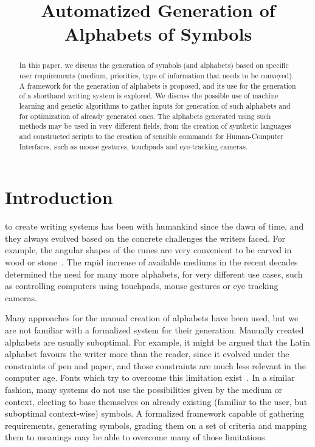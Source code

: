 \documentclass[conference]{IEEEtran}
\title{Automatized Generation of Alphabets of Symbols}
\author{
\IEEEauthorblockN{Serhii Hamotskyi}
\IEEEauthorblockA{
    Faculty of Informatics and Computer Technology \\
    Department of Computer Systems \\
    Igor Sykorsky Kyiv Polytechnic Institute \\
37, Prosp. Peremohy, Kyiv, Ukraine, 03056 \\
Email: shamotskyi@gmail.com}
}
\begin{document}
\maketitle              %

\begin{abstract}
In this paper, we discuss the generation of symbols (and alphabets) based on specific user requirements (medium, priorities, type of information that needs to be conveyed). A framework for the generation of alphabets is proposed, and its use for the generation of a shorthand writing system is explored. We discuss the possible use of machine learning and genetic algorithms to gather inputs for generation of such alphabets and for optimization of already generated ones. The alphabets generated using such methods may be used in very different fields, from the creation of synthetic languages and constructed scripts to the creation of sensible commands for Human-Computer Interfaces, such as mouse gestures, touchpads and eye-tracking cameras.
\end{abstract}

\section{Introduction}
%
\IEEEoverridecommandlockouts{} to create writing systems has been with humankind since the dawn of time, and they always evolved based on the concrete challenges the writers faced. For example, the angular shapes of the runes are very convenient to be carved in wood or stone~\cite{williams1996origin}. The rapid increase of available mediums in the recent decades determined the need for many more alphabets, for very different use cases, such as controlling computers using touchpads, mouse gestures or eye tracking cameras.

Many approaches for the manual creation of alphabets have been used, but we are not familiar with a formalized system for their generation. Manually created alphabets are usually suboptimal. For example, it might be argued that the Latin alphabet favours the writer more than the
reader, since it evolved under the constraints of pen and paper, and those constraints are much less relevant in the computer age. Fonts which try to overcome this limitation exist~\cite{dotsies}. In a similar fashion, many systems do not use the possibilities given by the medium or context, electing to base themselves on already existing (familiar to the user, but suboptimal context-wise) symbols. A formalized framework capable of gathering requirements, generating symbols, grading them on a set of criteria and mapping them to meanings may be able to overcome many of those limitations.
\end{document}
